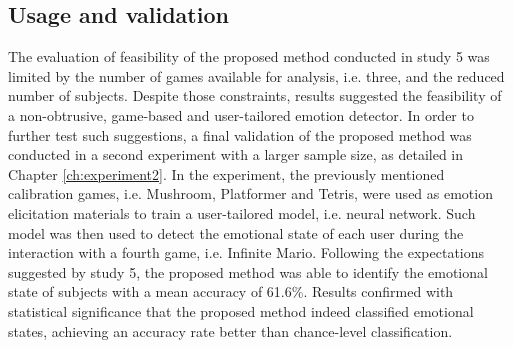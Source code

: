 \subsection{Usage and validation}

The evaluation of feasibility of the proposed method conducted in study 5 was limited by the number of games available for analysis, i.e. three, and the reduced number of subjects. Despite those constraints, results suggested the feasibility of a non-obtrusive, game-based and user-tailored emotion detector. In order to further test such suggestions, a final validation of the proposed method was conducted in a second experiment with a larger sample size, as detailed in Chapter \ref{ch:experiment2}. In the experiment, the previously mentioned calibration games, i.e. Mushroom, Platformer and Tetris, were used as emotion elicitation materials to train a user-tailored model, i.e. neural network. Such model was then used to detect the emotional state of each user during the interaction with a fourth game, i.e. Infinite Mario. Following the expectations suggested by study 5, the proposed method was able to identify the emotional state of subjects with a mean accuracy of 61.6\%. Results confirmed with statistical significance that the proposed method indeed classified emotional states, achieving an accuracy rate better than chance-level classification.

